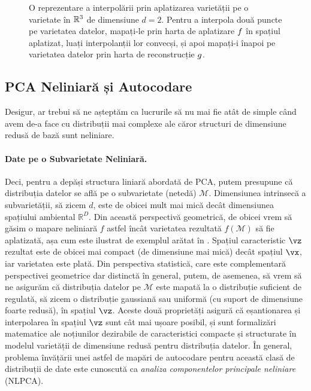 \documentclass[../../book-main_ro.tex]{subfiles}
\begin{document}
\begin{figure}
  \caption{O reprezentare a interpolării prin aplatizarea varietății
    pe o varietate în \(\mathbb{R}^{3}\) de dimensiune \(d = 2\). Pentru a interpola
    două puncte pe varietatea datelor, mapați-le prin harta de aplatizare
    \(f\) în spațiul aplatizat, luați interpolanții lor convecși,
    și apoi mapați-i înapoi pe varietatea datelor prin harta de
  reconstrucție \(g\).}
  \label{fig:idealized_interpolation}
\end{figure}

\subsection{PCA Neliniară și Autocodare}\label{sub:nonlinear-pca}\label{sec:NLPCA}
Desigur, ar trebui să ne așteptăm ca lucrurile să nu mai fie atât de simple
când avem de-a face cu distribuții mai complexe ale căror
structuri de dimensiune redusă de bază sunt neliniare.

\paragraph{Date pe o Subvarietate Neliniară.} Deci, pentru a depăși structura
liniară abordată de PCA, putem presupune că distribuția datelor se află pe o subvarietate (netedă) $\mathcal{M}$. Dimensiunea intrinsecă a subvarietății, să zicem $d$, este de obicei mult mai mică decât
dimensiunea spațiului ambiental $\mathbb{R}^D$. Din această perspectivă
geometrică, de obicei vrem să găsim o mapare neliniară $f$ astfel încât
varietatea rezultată
$f(\mathcal{M})$ să fie aplatizată, așa cum este ilustrat de exemplul arătat în
. Spațiul caracteristic $\vz$ rezultat
este de obicei
mai compact (de dimensiune mai mică) decât spațiul $\vx$, iar
varietatea este plată.
Din perspectiva statistică, care este complementară perspectivei geometrice
dar distinctă în general, putem, de asemenea, să vrem să ne asigurăm că distribuția
datelor pe $\mathcal{M}$ este mapată la o distribuție suficient de regulată,
să zicem o distribuție gaussiană sau uniformă (cu
suport de dimensiune foarte redusă), în spațiul $\vz$. Aceste două proprietăți asigură că eșantionarea și interpolarea în spațiul $\vz$ sunt cât mai ușoare posibil, și sunt formalizări matematice ale
noțiunilor dezirabile de caracteristici compacte și structurate în modelul varietății
de dimensiune redusă pentru distribuția datelor.
În general, problema învățării unei astfel de mapări de autocodare pentru această clasă
de distribuții de date este cunoscută ca {\em analiza componentelor principale neliniare}
(NLPCA).
\end{document}
